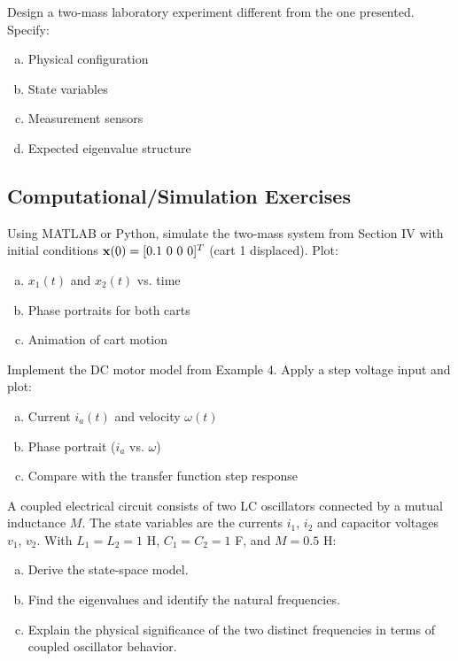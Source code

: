 \begin{exercise}
Design a two-mass laboratory experiment different from the one presented. Specify:
\begin{enumerate}[(a)]
    \item Physical configuration
    \item State variables
    \item Measurement sensors
    \item Expected eigenvalue structure
\end{enumerate}
\end{exercise}

\subsection*{Computational/Simulation Exercises}

\begin{exercise}
Using MATLAB or Python, simulate the two-mass system from Section IV with initial conditions $\state(0) = [0.1\ 0\ 0\ 0]^T$ (cart 1 displaced). Plot:
\begin{enumerate}[(a)]
    \item $x_1(t)$ and $x_2(t)$ vs. time
    \item Phase portraits for both carts
    \item Animation of cart motion
\end{enumerate}
\end{exercise}

\begin{exercise}
Implement the DC motor model from Example 4. Apply a step voltage input and plot:
\begin{enumerate}[(a)]
    \item Current $i_a(t)$ and velocity $\omega(t)$
    \item Phase portrait ($i_a$ vs. $\omega$)
    \item Compare with the transfer function step response
\end{enumerate}
\end{exercise}

\begin{exercise}
A coupled electrical circuit consists of two LC oscillators connected by a mutual inductance $M$. The state variables are the currents $i_1$, $i_2$ and capacitor voltages $v_1$, $v_2$. With $L_1 = L_2 = 1$ H, $C_1 = C_2 = 1$ F, and $M = 0.5$ H:
\begin{enumerate}[(a)]
    \item Derive the state-space model.
    \item Find the eigenvalues and identify the natural frequencies.
    \item Explain the physical significance of the two distinct frequencies in terms of coupled oscillator behavior.
\end{enumerate}
\end{exercise}

